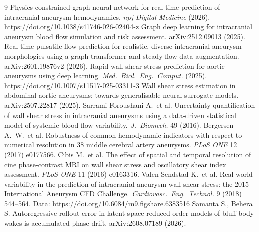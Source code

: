 \documentclass[11pt,a4paper]{article}
\begin{document}
\begin{thebibliography}{9}
 Physics-constrained graph neural network for real-time
prediction of intracranial aneurysm hemodynamics. \emph{npj Digital Medicine}
(2026). \url{https://doi.org/10.1038/s41746-026-02404-z}
 Graph deep learning for intracranial aneurysm blood
flow simulation and risk assessment. arXiv:2512.09013 (2025).
 Real-time pulsatile flow prediction for realistic,
diverse intracranial aneurysm morphologies using a graph transformer and
steady-flow data augmentation. arXiv:2601.19876v2 (2026).
 Rapid wall shear stress prediction for aortic aneurysms
using deep learning. \emph{Med.\ Biol.\ Eng.\ Comput.} (2025).
\url{https://doi.org/10.1007/s11517-025-03311-3}
 Wall shear stress estimation in abdominal aortic aneurysms:
towards generalisable neural surrogate models. arXiv:2507.22817 (2025).
 Sarrami-Foroushani A.\ et al. Uncertainty
quantification of wall shear stress in intracranial aneurysms using a
data-driven statistical model of systemic blood flow variability.
\emph{J.\ Biomech.} 49 (2016).
 Bergersen A.\ W.\ et al. Robustness of common
hemodynamic indicators with respect to numerical resolution in 38 middle
cerebral artery aneurysms. \emph{PLoS ONE} 12 (2017) e0177566.
 Cibis M.\ et al. The effect of spatial and temporal
resolution of cine phase-contrast MRI on wall shear stress and oscillatory
shear index assessment. \emph{PLoS ONE} 11 (2016) e0163316.
 Valen-Sendstad K.\ et al. Real-world variability in
the prediction of intracranial aneurysm wall shear stress: the 2015
International Aneurysm CFD Challenge. \emph{Cardiovasc.\ Eng.\ Technol.} 9
(2018) 544--564. Data: \url{https://doi.org/10.6084/m9.figshare.6383516}
 Samanta S., Behera S. Autoregressive rollout error in
latent-space reduced-order models of bluff-body wakes is accumulated phase
drift. arXiv:2608.07189 (2026).
\end{thebibliography}
\end{document}

